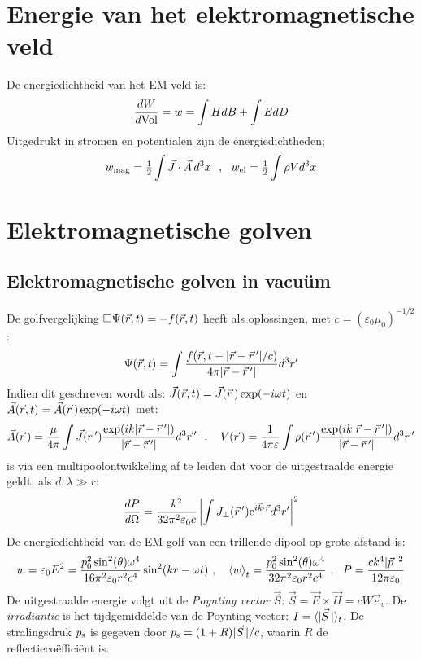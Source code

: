\documentclass[twoside]{report}
\begin{document}
\section{Energie van het elektromagnetische veld}
De energiedichtheid van het EM veld is:
\[
\frac{dW}{d{\rm Vol}}=w=\int HdB+\int EdD
\]
Uitgedrukt in stromen en potentialen zijn de energiedichtheden;
\[
w_{\rm mag}=\mbox{$\frac{1}{2}$}\int\vec{J}\cdot\vec{A}\,d^3x~~,~~w_{\rm el}=\mbox{$\frac{1}{2}$}\int\rho Vd^3x
\]

\section{Elektromagnetische golven}
\subsection{Elektromagnetische golven in vacu\"um}
De golfvergelijking $\Box\Psi(\vec{r},t)=-f(\vec{r},t)$ heeft als oplossingen, met
$c=(\varepsilon_0\mu_0)^{-1/2}$:
\[
\Psi(\vec{r},t)=\int\frac{f(\vec{r},t-|\vec{r}-\vec{r}\,'|/c)}{4\pi|\vec{r}-\vec{r}\,'|}d^3r'
\]
Indien dit geschreven wordt als: $\vec{J}(\vec{r},t)=\vec{J}(\vec{r}\,)\exp(-i\omega t)$ en
$\vec{A}(\vec{r},t)=\vec{A}(\vec{r}\,)\exp(-i\omega t)$ met:
\[
\vec{A}(\vec{r}\,)=\frac{\mu}{4\pi}\int\vec{J}(\vec{r}\,')\frac{\exp(ik|\vec{r}-\vec{r}\,'|)}{|\vec{r}-\vec{r}\,'|}d^3\vec{r}\,'~~,~~~
V(\vec{r}\,)=\frac{1}{4\pi\varepsilon}\int\rho(\vec{r}\,')\frac{\exp(ik|\vec{r}-\vec{r}\,'|)}{|\vec{r}-\vec{r}\,'|}d^3\vec{r}\,'
\]
is via een multipoolontwikkeling af te leiden dat voor de uitgestraalde
energie geldt, als $d,\lambda\gg r$:
\[
\frac{dP}{d\Omega}=\frac{k^2}{32\pi^2\varepsilon_0c}\left|\int J_\perp(\vec{r}\,'){\rm e}^{i\vec{k}\cdot\vec{r}}d^3r'\right|^2
\]
De energiedichtheid van de EM golf van een trillende dipool op grote afstand
is:
\[
w=\varepsilon_0E^2=\frac{p^2_0\sin^2(\theta)\omega^4}{16\pi^2\varepsilon_0r^2c^4}\sin^2(kr-\omega t)~,~~~
\left\langle w \right\rangle_t=\frac{p^2_0\sin^2(\theta)\omega^4}{32\pi^2\varepsilon_0r^2c^4}~,~~
P=\frac{ck^4|\vec{p}\,|^2}{12\pi\varepsilon_0}
\]
De uitgestraalde energie volgt uit de {\it Poynting vector} $\vec{S}$:
$\vec{S}=\vec{E}\times\vec{H}=cW\vec{e}_v$. De {\it irradiantie} is het
tijdgemiddelde van de Poynting vector: $I=\langle|\vec{S}\,|\rangle_t$. De
stralingsdruk $p_{\rm s}$ is gegeven door $p_{\rm s}=(1+R)|\vec{S}\,|/c$,
waarin $R$ de reflectieco\"effici\"ent is.
\end{document}
